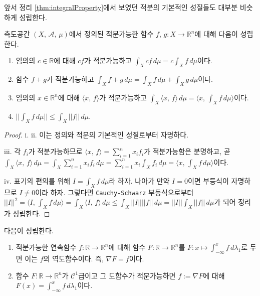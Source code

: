 앞서 정리 \ref{thm:integralProperty}에서 보였던 적분의 기본적인 성질들도 대부분 비슷하게 성립한다.

\begin{corollary}
    측도공간 $(X,\,\mathcal{A},\,\mu)$에서 정의된 적분가능한 함수 $f,\,g:X\to\mathbb{R}^n$에 대해 다음이 성립한다.
    \begin{enumerate}
        \item 임의의 $c\in\mathbb{R}$에 대해 $cf$가 적분가능하고 $\int_Xcf\,d\mu=c\int_Xf\,d\mu$이다.
        \item 함수 $f+g$가 적분가능하고 $\int_Xf+g\,d\mu=\int_Xf\,d\mu+\int_Xg\,d\mu$이다.
        \item 임의의 $x\in\mathbb{R}^n$에 대해 $\langle x,\,f\rangle$가 적분가능하고 $\int_X\langle x,\,f\rangle\,d\mu=\langle x,\,\int_Xf\,d\mu\rangle$이다.
        \item $||\int_Xf\,d\mu||\leq\int_X||f||\,d\mu$.
    \end{enumerate}
\end{corollary}

\begin{proof}
    i. ii. 이는 정의와 적분의 기본적인 성질로부터 자명하다.

    iii. 각 $f_i$가 적분가능하므로 $\langle x,\,f\rangle=\sum_{i=1}^nx_if_i$가 적분가능함은 분명하고, 곧 $\int_X\langle x,\,f\rangle\,d\mu=\int_X\sum_{i=1}^nx_if_i\,d\mu=\sum_{i=1}^nx_i\int_Xf_i\,d\mu=\langle x,\,\int_Xf\,d\mu\rangle$이다.

    iv. 표기의 편의를 위해 $I=\int_Xf\,d\mu$라 하자. 나아가 만약 $I=0$이면 부등식이 자명하므로 $I\ne0$이라 하자. 그렇다면 \texttt{Cauchy-Schwarz} 부등식으로부터 $||I||^2=\langle I,\,\int_Xf\,d\mu\rangle=\int_X\langle I,\,f\rangle\,d\mu\leq\int_X||I||||f||\,d\mu=||I||\int_X||f||\,d\mu$가 되어 정리가 성립한다.
\end{proof}

\begin{corollary}
    다음이 성립한다.
    \begin{enumerate}
        \item 적분가능한 연속함수 $f:\mathbb{R}\to\mathbb{R}^n$에 대해 함수 $F:\mathbb{R}\to\mathbb{R}^n$를 $F:x\mapsto\int_{-\infty}^xf\,d\lambda_1$로 두면 이는 $f$의 역도함수이다. 즉, $\nabla F=f$이다.
        \item 함수 $F:\mathbb{R}\to\mathbb{R}^n$가 $\mathcal{C}^1$급이고 그 도함수가 적분가능하면 $f:=\nabla F$에 대해 $F(x)=\int_{-\infty}^xf\,d\lambda_1$이다.
    \end{enumerate}
\end{corollary}

